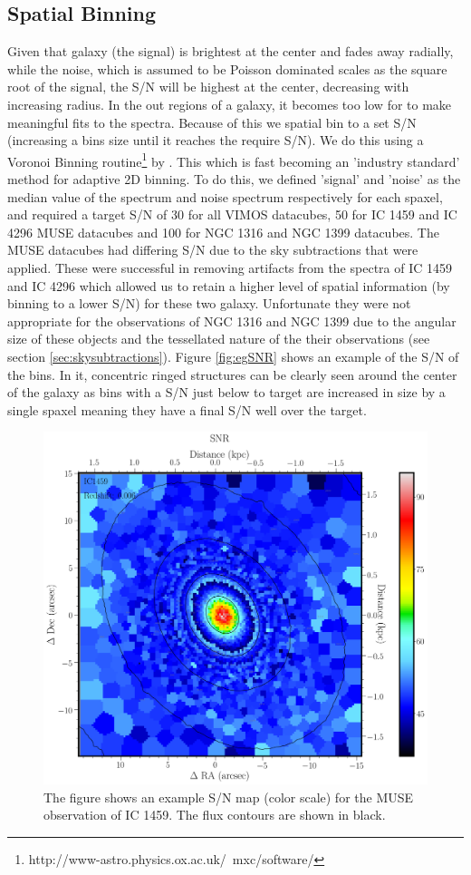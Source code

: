 	\subsection{Spatial Binning}
		Given that galaxy (the signal) is brightest at the center and fades away radially, while the noise, which is assumed to be Poisson dominated scales as the square root of the signal, the S/N will be highest at the center, decreasing with increasing radius. In the out regions of a galaxy, it becomes too low for to make meaningful fits to the spectra. Because of this we spatial bin to a set S/N (increasing a bins size until it reaches the require S/N). We do this using a Voronoi Binning routine\footnote{http://www-astro.physics.ox.ac.uk/~mxc/software/} by \citet{Cappellari2003}. This  which is fast becoming an 'industry standard' method for adaptive 2D binning. To do this, we defined 'signal' and 'noise' as the median value of the spectrum and noise spectrum respectively for each spaxel, and required a target S/N of 30 for all VIMOS datacubes, 50 for IC 1459 and IC 4296 MUSE datacubes and 100 for NGC 1316 and NGC 1399 datacubes. The MUSE datacubes had differing S/N due to the sky subtractions that were applied. These were successful in removing artifacts from the spectra of IC 1459 and IC 4296 which allowed us to retain a higher level of spatial information (by binning to a lower S/N) for these two galaxy. Unfortunate they were not appropriate for the observations of NGC 1316 and NGC 1399 due to the angular size of these objects and the tessellated nature of the their observations (see section \ref{sec:skysubtractions}). Figure \ref{fig:egSNR} shows an example of the S/N of the bins. In it, concentric ringed structures can be clearly seen around the center of the galaxy as bins with a S/N just below to target are increased in size by a single spaxel meaning they have a final S/N well over the target.

		\begin{figure}
			\centering
			\includegraphics[width=.6\textwidth]{chapter2/egSNR.png}
			\caption[Example S/N map]{The figure shows an example S/N map (color scale) for the MUSE observation of IC 1459. The flux contours are shown in black.}
			\label{fig:MassRe}
		\end{figure}

